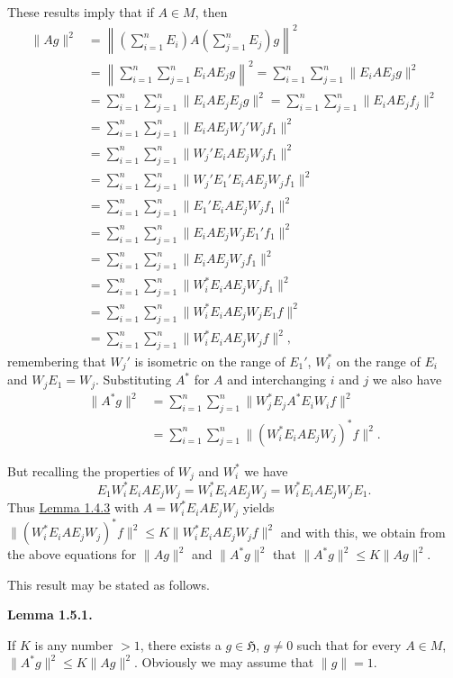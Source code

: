 \documentclass[twoside,leqno]{article}
\newcommand{\cH}{\mathfrak{H}}
\newcommand{\StatementTarget}[1]{\phantomsection\hypertarget{stmt:#1}{}}
\newcommand{\StatementRef}[2]{\hyperlink{stmt:#1}{#2}}
\newenvironment{statement}[2]{%
  \par\medskip
  \noindent\StatementTarget{#1}\hspace*{\parindent}\textbf{#2.}\ \itshape\ignorespaces
}{\par}
\begin{document}
These results imply that if $A\in M$, then
\begin{align*}
 \lVert Ag\rVert^2
 &=\left\lVert\left(\sum_{i=1}^nE_i\right)
        A\left(\sum_{j=1}^nE_j\right)g\right\rVert^2\\
 &=\left\lVert\sum_{i=1}^n\sum_{j=1}^nE_iAE_jg\right\rVert^2
  =\sum_{i=1}^n\sum_{j=1}^n\lVert E_iAE_jg\rVert^2\\
 &=\sum_{i=1}^n\sum_{j=1}^n\lVert E_iAE_jE_jg\rVert^2
  =\sum_{i=1}^n\sum_{j=1}^n\lVert E_iAE_jf_j\rVert^2\\
 &=\sum_{i=1}^n\sum_{j=1}^n\lVert E_iAE_jW_j'W_jf_1\rVert^2\\
 &=\sum_{i=1}^n\sum_{j=1}^n\lVert W_j'E_iAE_jW_jf_1\rVert^2\\
 &=\sum_{i=1}^n\sum_{j=1}^n\lVert W_j'E_1'E_iAE_jW_jf_1\rVert^2\\
 &=\sum_{i=1}^n\sum_{j=1}^n\lVert E_1'E_iAE_jW_jf_1\rVert^2\\
 &=\sum_{i=1}^n\sum_{j=1}^n\lVert E_iAE_jW_jE_1'f_1\rVert^2\\
 &=\sum_{i=1}^n\sum_{j=1}^n\lVert E_iAE_jW_jf_1\rVert^2\\
 &=\sum_{i=1}^n\sum_{j=1}^n\lVert W_i^*E_iAE_jW_jf_1\rVert^2\\
 &=\sum_{i=1}^n\sum_{j=1}^n\lVert W_i^*E_iAE_jW_jE_1f\rVert^2\\
 &=\sum_{i=1}^n\sum_{j=1}^n\lVert W_i^*E_iAE_jW_jf\rVert^2,
\end{align*}
remembering that $W_j'$ is isometric on the range of $E_1'$, $W_i^*$ on the range of $E_i$
and $W_jE_1=W_j$. Substituting $A^*$ for $A$ and interchanging $i$ and $j$ we also have
\begin{align*}
 \lVert A^*g\rVert^2
 &=\sum_{i=1}^n\sum_{j=1}^n\lVert W_j^*E_jA^*E_iW_if\rVert^2\\
 &=\sum_{i=1}^n\sum_{j=1}^n\lVert(W_i^*E_iAE_jW_j)^*f\rVert^2.
\end{align*}

But recalling the properties of $W_j$ and $W_i^*$ we have
\[
 E_1W_i^*E_iAE_jW_j=W_i^*E_iAE_jW_j=W_i^*E_iAE_jW_jE_1.
\]
Thus \StatementRef{lemma:1.4.3}{Lemma 1.4.3} with $A=W_i^*E_iAE_jW_j$ yields
$\lVert(W_i^*E_iAE_jW_j)^*f\rVert^2
\allowbreak\leq K\lVert W_i^*E_iAE_jW_jf\rVert^2$
and with this, we obtain from the above equations for $\lVert Ag\rVert^2$ and
$\lVert A^*g\rVert^2$ that $\lVert A^*g\rVert^2\leq K\lVert Ag\rVert^2$.

This result may be stated as follows.

\begin{statement}{lemma:1.5.1}{Lemma 1.5.1}
If $K$ is any number $>1$, there exists a $g\in\cH$, $g\ne0$ such that for
every $A\in M$, $\lVert A^*g\rVert^2\leq K\lVert Ag\rVert^2$. Obviously we may assume that
$\lVert g\rVert=1$.
\end{statement}
\end{document}

